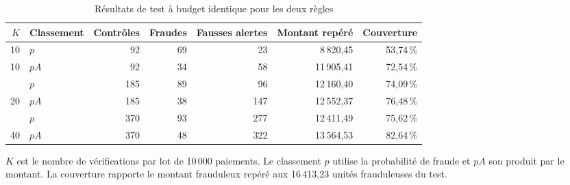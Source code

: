 \documentclass[11pt,a4paper]{article}
\begin{document}
\begin{table}[htbp]
\centering
\caption{Résultats de test à budget identique pour les deux règles}
\label{tab:res-budgets}
\small
\setlength{\tabcolsep}{4pt}
\begin{tabular}{@{}rlrrrrr@{}}
\toprule
$K$ & Classement & Contrôles & Fraudes & Fausses alertes & Montant repéré & Couverture \\
\midrule
10 & $p$   & 92  & 69 & 23  & 8\,820,45  & 53,74\,\% \\
10 & $pA$  & 92  & 34 & 58  & 11\,905,41 & 72,54\,\% \\
\addlinespace
20 & $p$   & 185 & 89 & 96  & 12\,160,40 & 74,09\,\% \\
20 & $pA$  & 185 & 38 & 147 & 12\,552,37 & 76,48\,\% \\
\addlinespace
40 & $p$   & 370 & 93 & 277 & 12\,411,49 & 75,62\,\% \\
40 & $pA$  & 370 & 48 & 322 & 13\,564,53 & 82,64\,\% \\
\bottomrule
\end{tabular}
\par\smallskip
\begin{minipage}{0.94\linewidth}\footnotesize
$K$ est le nombre de vérifications par lot de 10\,000 paiements. Le classement $p$ utilise la probabilité de fraude et $pA$ son produit par le montant. La couverture rapporte le montant frauduleux repéré aux 16\,413,23 unités frauduleuses du test.
\end{minipage}
\end{table}
\end{document}
